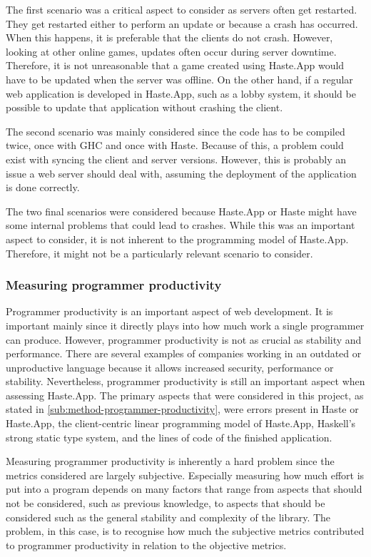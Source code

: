 \documentclass[a4paper]{article}
\begin{document}
The first scenario was a critical aspect to consider as servers often get restarted. They get restarted either to perform an update or because a crash has occurred. When this happens, it is preferable that the clients do not crash. However, looking at other online games, updates often occur during server downtime. Therefore, it is not unreasonable that a game created using Haste.App would have to be updated when the server was offline. On the other hand, if a regular web application is developed in Haste.App, such as a lobby system, it should be possible to update that application without crashing the client.

The second scenario was mainly considered since the code has to be compiled twice, once with GHC and once with Haste. Because of this, a problem could exist with syncing the client and server versions. However, this is probably an issue a web server should deal with, assuming the deployment of the application is done correctly. 

The two final scenarios were considered because Haste.App or Haste might have some internal problems that could lead to crashes. While this was an important aspect to consider, it is not inherent to the programming model of Haste.App. Therefore, it might not be a particularly relevant scenario to consider.



\subsubsection{Measuring programmer productivity}%
Programmer productivity is an important aspect of web development. It is important mainly since it directly plays into how much work a single programmer can produce. However, programmer productivity is not as crucial as stability and performance. There are several examples of companies working in an outdated or unproductive language because it allows increased security, performance or stability. Nevertheless, programmer productivity is still an important aspect when assessing Haste.App. The primary aspects that were considered in this project, as stated in \cref{sub:method-programmer-productivity}, were errors present in Haste or Haste.App, the client-centric linear programming model of Haste.App, Haskell's strong static type system, and the lines of code of the finished application.

Measuring programmer productivity is inherently a hard problem since the metrics considered are largely subjective. Especially measuring how much effort is put into a program depends on many factors that range from aspects that should not be considered, such as previous knowledge, to aspects that should be considered such as the general stability and complexity of the library. The problem, in this case, is to recognise how much the subjective metrics contributed to programmer productivity in relation to the objective metrics. 
\end{document}
